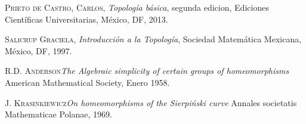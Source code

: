 \begin{thebibliography}{XX}
	 \textsc{Prieto de Castro, Carlos},
\textit{Topología básica}, segunda edicion,
Ediciones Científicas Universitarias, México, DF, 2013.

	 \textsc{Salicrup Graciela},
\textit{Introducción a la Topología}, Sociedad Matemática Mexicana, México, DF, 1997.


	 \textsc{R.D. Anderson}\textit{The Algebraic simplicity of certain groups of homeomorphisms} American Mathematical Society, Enero 1958.
	
	 \textsc{J. Krasinkiewicz}\textit{On  homeomorphisms of the Sierpiński curve} Annales societatis Mathematicae Polanae, 1969.
\end{thebibliography}